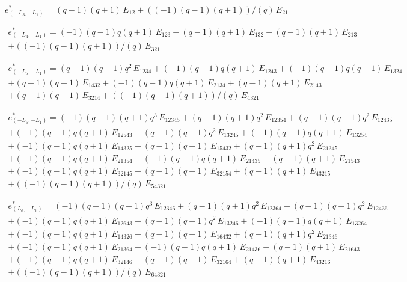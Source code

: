 $e^*_{(-L_3, -L_1)} = (q-1) (q+1)\, E_{12} + ((-1) (q-1) (q+1))/(q)\, E_{21}$

\begin{multline*}
e^*_{(-L_4, -L_1)} = 
  (-1) (q-1) q (q+1)\, E_{123} + (q-1) (q+1)\, E_{132} + (q-1) (q+1)\, E_{213}
  \\
  + ((-1) (q-1) (q+1))/(q)\, E_{321}
\end{multline*}

\begin{multline*}
e^*_{(-L_5, -L_1)} = 
  (q-1) (q+1) q^2\, E_{1234} + (-1) (q-1) q (q+1)\, E_{1243} + (-1) (q-1) q (q+1)\, E_{1324}
  \\
  + (q-1) (q+1)\, E_{1432} + (-1) (q-1) q (q+1)\, E_{2134} + (q-1) (q+1)\, E_{2143}
  \\
  + (q-1) (q+1)\, E_{3214} + ((-1) (q-1) (q+1))/(q)\, E_{4321}
\end{multline*}

\begin{multline*}
e^*_{(-L_6, -L_1)} = 
  (-1) (q-1) (q+1) q^3\, E_{12345} + (q-1) (q+1) q^2\, E_{12354} + (q-1) (q+1) q^2\, E_{12435}
  \\
  + (-1) (q-1) q (q+1)\, E_{12543} + (q-1) (q+1) q^2\, E_{13245} + (-1) (q-1) q (q+1)\, E_{13254}
  \\
  + (-1) (q-1) q (q+1)\, E_{14325} + (q-1) (q+1)\, E_{15432} + (q-1) (q+1) q^2\, E_{21345}
  \\
  + (-1) (q-1) q (q+1)\, E_{21354} + (-1) (q-1) q (q+1)\, E_{21435} + (q-1) (q+1)\, E_{21543}
  \\
  + (-1) (q-1) q (q+1)\, E_{32145} + (q-1) (q+1)\, E_{32154} + (q-1) (q+1)\, E_{43215}
  \\
  + ((-1) (q-1) (q+1))/(q)\, E_{54321}
\end{multline*}

\begin{multline*}
e^*_{(L_6, -L_1)} = 
  (-1) (q-1) (q+1) q^3\, E_{12346} + (q-1) (q+1) q^2\, E_{12364} + (q-1) (q+1) q^2\, E_{12436}
  \\
  + (-1) (q-1) q (q+1)\, E_{12643} + (q-1) (q+1) q^2\, E_{13246} + (-1) (q-1) q (q+1)\, E_{13264}
  \\
  + (-1) (q-1) q (q+1)\, E_{14326} + (q-1) (q+1)\, E_{16432} + (q-1) (q+1) q^2\, E_{21346}
  \\
  + (-1) (q-1) q (q+1)\, E_{21364} + (-1) (q-1) q (q+1)\, E_{21436} + (q-1) (q+1)\, E_{21643}
  \\
  + (-1) (q-1) q (q+1)\, E_{32146} + (q-1) (q+1)\, E_{32164} + (q-1) (q+1)\, E_{43216}
  \\
  + ((-1) (q-1) (q+1))/(q)\, E_{64321}
\end{multline*}

